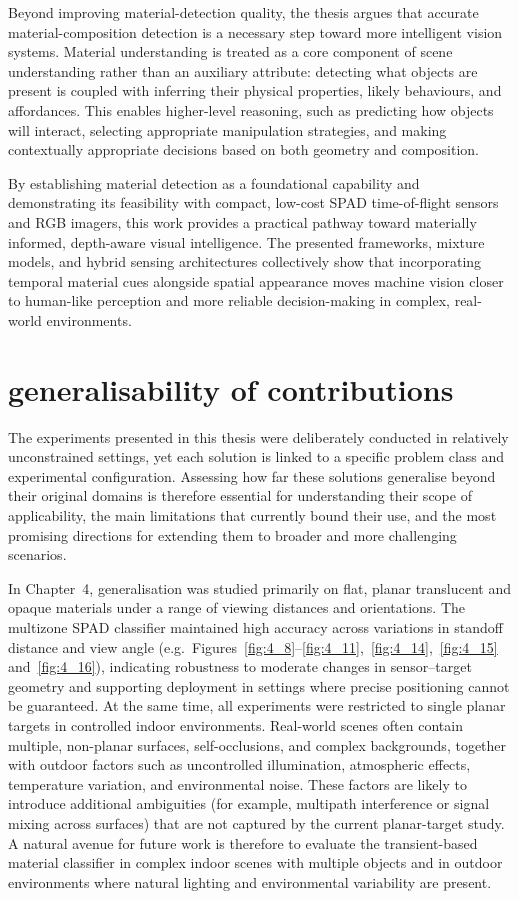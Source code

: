 \documentclass[12pt,a4paper,oneside]{report}
\let\oldsection\section
\renewcommand{\section}{\clearpage\oldsection}
\begin{document}
Beyond improving material-detection quality, the thesis argues that accurate material-composition detection is a necessary step toward more intelligent vision systems. Material understanding is treated as a core component of scene understanding rather than an auxiliary attribute: detecting what objects are present is coupled with inferring their physical properties, likely behaviours, and affordances. This enables higher-level reasoning, such as predicting how objects will interact, selecting appropriate manipulation strategies, and making contextually appropriate decisions based on both geometry and composition.

By establishing material detection as a foundational capability and demonstrating its feasibility with compact, low-cost SPAD time-of-flight sensors and RGB imagers, this work provides a practical pathway toward materially informed, depth-aware visual intelligence. The presented frameworks, mixture models, and hybrid sensing architectures collectively show that incorporating temporal material cues alongside spatial appearance moves machine vision closer to human-like perception and more reliable decision-making in complex, real-world environments.

\section{generalisability of contributions}
\label{sec:generalisability_of_contributions_chapter7}
\noindent The experiments presented in this thesis were deliberately conducted in relatively unconstrained settings, yet each solution is linked to a specific problem class and experimental configuration. Assessing how far these solutions generalise beyond their original domains is therefore essential for understanding their scope of applicability, the main limitations that currently bound their use, and the most promising directions for extending them to broader and more challenging scenarios.

In Chapter~4, generalisation was studied primarily on flat, planar translucent and opaque materials under a range of viewing distances and orientations. The multizone SPAD classifier maintained high accuracy across variations in standoff distance and view angle (e.g.\ Figures~\ref{fig:4_8}--\ref{fig:4_11},~\ref{fig:4_14},~\ref{fig:4_15} and~\ref{fig:4_16}), indicating robustness to moderate changes in sensor--target geometry and supporting deployment in settings where precise positioning cannot be guaranteed. At the same time, all experiments were restricted to single planar targets in controlled indoor environments. Real-world scenes often contain multiple, non-planar surfaces, self-occlusions, and complex backgrounds, together with outdoor factors such as uncontrolled illumination, atmospheric effects, temperature variation, and environmental noise. These factors are likely to introduce additional ambiguities (for example, multipath interference or signal mixing across surfaces) that are not captured by the current planar-target study. A natural avenue for future work is therefore to evaluate the transient-based material classifier in complex indoor scenes with multiple objects and in outdoor environments where natural lighting and environmental variability are present.
\end{document}
